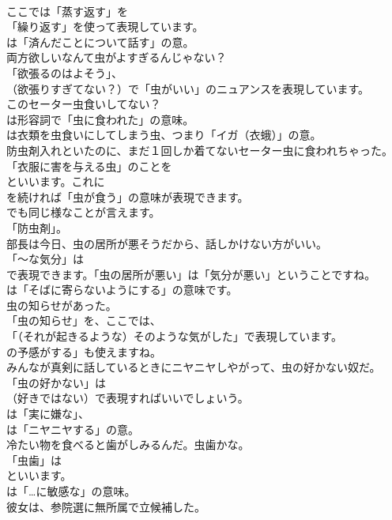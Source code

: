 \documentclass[8pt]{extreport}
\begin{document}
\begin{CJK}{UTF8}{min}
\\	ここでは「蒸す返す」を
\\	「繰り返す」を使って表現しています。
\\	は「済んだことについて話す」の意。	
\\	両方欲しいなんて虫がよすぎるんじゃない？ 
\\	「欲張るのはよそう」、
\\	（欲張りすぎてない？）で「虫がいい」のニュアンスを表現しています。	
\\	このセーター虫食いしてない？ 
\\	は形容詞で「虫に食われた」の意味。
\\	は衣類を虫食いにしてしまう虫、つまり「イガ（衣蛾）」の意。	
\\	防虫剤入れといたのに、まだ１回しか着てないセーター虫に食われちゃった。 
\\	「衣服に害を与える虫」のことを
\\	といいます。これに
\\	を続ければ「虫が食う」の意味が表現できます。
\\	でも同じ様なことが言えます。
\\	「防虫剤」。	
\\	部長は今日、虫の居所が悪そうだから、話しかけない方がいい。 
\\	「～な気分」は
\\	で表現できます。「虫の居所が悪い」は「気分が悪い」ということですね。
\\	は「そばに寄らないようにする」の意味です。	
\\	虫の知らせがあった。 
\\	「虫の知らせ」を、ここでは、
\\	「（それが起きるような）そのような気がした」で表現しています。
\\	の予感がする」も使えますね。	
\\	みんなが真剣に話しているときにニヤニヤしやがって、虫の好かない奴だ。 
\\	「虫の好かない」は 
\\	（好きではない）で表現すればいいでしょいう。
\\	は「実に嫌な」、
\\	は「ニヤニヤする」の意。	
\\	冷たい物を食べると歯がしみるんだ。虫歯かな。 
\\	「虫歯」は 
\\	といいます。
\\	は「…に敏感な」の意味。	
\\	彼女は、参院選に無所属で立候補した。 

\end{CJK}
\end{document}
